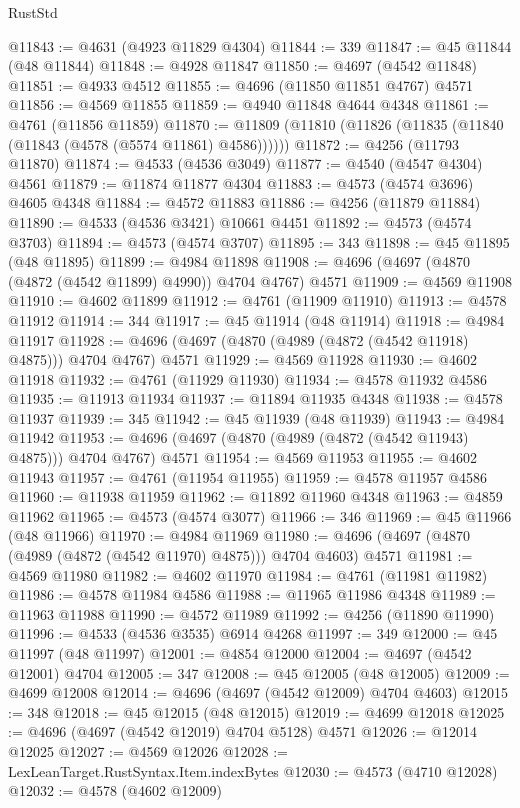 \begin{lexlean}{RustStd}
\begin{coremodule}
@11843 := @4631 (@4923 @11829 @4304)
@11844 := 339
@11847 := @45 @11844 (@48 @11844)
@11848 := @4928 @11847
@11850 := @4697 (@4542 @11848)
@11851 := @4933 @4512
@11855 := @4696 (@11850 @11851 @4767) @4571
@11856 := @4569 @11855
@11859 := @4940 @11848 @4644 @4348
@11861 := @4761 (@11856 @11859)
@11870 := @11809 (@11810 (@11826 (@11835 (@11840 (@11843 (@4578 (@5574 @11861) @4586))))))
@11872 := @4256 (@11793 @11870)
@11874 := @4533 (@4536 @3049)
@11877 := @4540 (@4547 @4304) @4561
@11879 := @11874 @11877 @4304
@11883 := @4573 (@4574 @3696) @4605 @4348
@11884 := @4572 @11883
@11886 := @4256 (@11879 @11884)
@11890 := @4533 (@4536 @3421) @10661 @4451
@11892 := @4573 (@4574 @3703)
@11894 := @4573 (@4574 @3707)
@11895 := 343
@11898 := @45 @11895 (@48 @11895)
@11899 := @4984 @11898
@11908 := @4696 (@4697 (@4870 (@4872 (@4542 @11899) @4990)) @4704 @4767) @4571
@11909 := @4569 @11908
@11910 := @4602 @11899
@11912 := @4761 (@11909 @11910)
@11913 := @4578 @11912
@11914 := 344
@11917 := @45 @11914 (@48 @11914)
@11918 := @4984 @11917
@11928 := @4696 (@4697 (@4870 (@4989 (@4872 (@4542 @11918) @4875))) @4704 @4767) @4571
@11929 := @4569 @11928
@11930 := @4602 @11918
@11932 := @4761 (@11929 @11930)
@11934 := @4578 @11932 @4586
@11935 := @11913 @11934
@11937 := @11894 @11935 @4348
@11938 := @4578 @11937
@11939 := 345
@11942 := @45 @11939 (@48 @11939)
@11943 := @4984 @11942
@11953 := @4696 (@4697 (@4870 (@4989 (@4872 (@4542 @11943) @4875))) @4704 @4767) @4571
@11954 := @4569 @11953
@11955 := @4602 @11943
@11957 := @4761 (@11954 @11955)
@11959 := @4578 @11957 @4586
@11960 := @11938 @11959
@11962 := @11892 @11960 @4348
@11963 := @4859 @11962
@11965 := @4573 (@4574 @3077)
@11966 := 346
@11969 := @45 @11966 (@48 @11966)
@11970 := @4984 @11969
@11980 := @4696 (@4697 (@4870 (@4989 (@4872 (@4542 @11970) @4875))) @4704 @4603) @4571
@11981 := @4569 @11980
@11982 := @4602 @11970
@11984 := @4761 (@11981 @11982)
@11986 := @4578 @11984 @4586
@11988 := @11965 @11986 @4348
@11989 := @11963 @11988
@11990 := @4572 @11989
@11992 := @4256 (@11890 @11990)
@11996 := @4533 (@4536 @3535) @6914 @4268
@11997 := 349
@12000 := @45 @11997 (@48 @11997)
@12001 := @4854 @12000
@12004 := @4697 (@4542 @12001) @4704
@12005 := 347
@12008 := @45 @12005 (@48 @12005)
@12009 := @4699 @12008
@12014 := @4696 (@4697 (@4542 @12009) @4704 @4603)
@12015 := 348
@12018 := @45 @12015 (@48 @12015)
@12019 := @4699 @12018
@12025 := @4696 (@4697 (@4542 @12019) @4704 @5128) @4571
@12026 := @12014 @12025
@12027 := @4569 @12026
@12028 := LexLeanTarget.RustSyntax.Item.indexBytes
@12030 := @4573 (@4710 @12028)
@12032 := @4578 (@4602 @12009)

\end{coremodule}
\end{lexlean}
